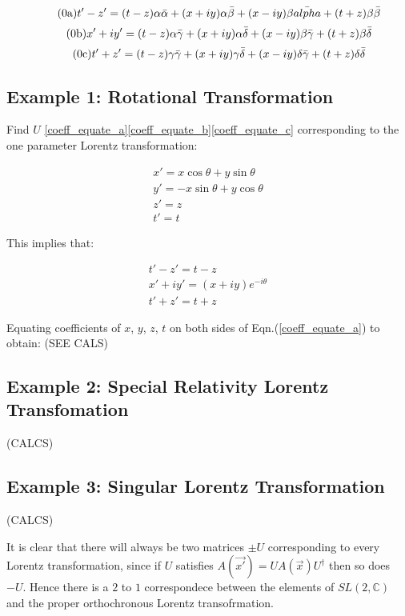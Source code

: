 \begin{equation}\label{coeff_equate_a}
\tag{{\theequation}a}
t' - z' = (t-z)\alpha\bar{\alpha} + (x + iy)\alpha\bar{\beta} + (x - iy)\beta\bar{alpha} + (t+z)\beta\bar{\beta}
\end{equation}
\begin{equation}\label{coeff_equate_b}
\tag{{\theequation}b}
x' + iy' = (t-z)\alpha\bar{\gamma} + (x + iy)\alpha\bar{\delta} + (x-iy)\beta\bar{\gamma} + (t+z)\beta\bar{\delta}
\end{equation}
\begin{equation}\label{coeff_equate_c}
\tag{{\theequation}c}
t' + z' = (t-z)\gamma\bar{\gamma} + (x + iy)\gamma\bar{\delta} + (x-iy)\delta\bar{\gamma} + (t+z)\delta\bar{\delta}
\end{equation}

\subsection{Example 1: Rotational Transformation}

\noindent Find $U$ \ref{coeff_equate_a}\ref{coeff_equate_b}\ref{coeff_equate_c} corresponding to the one parameter Lorentz transformation:

\begin{eqnarray*} 
x' = x\cos{\theta} + y\sin{\theta} \\
y' = -x\sin{\theta} + y\cos{\theta} \\
z' = z \\
t' = t
\end{eqnarray*} 

\noindent This implies that:

\begin{eqnarray*}
t'-z' = t-z \\
x'+iy' = (x+iy) e^{-i \theta} \\
t'+z' = t+z
\end{eqnarray*}

Equating coefficients of $x$, $y$, $z$, $t$ on both sides of Eqn.(\ref{coeff_equate_a}) to obtain: (SEE CALS)

\subsection{Example 2: Special Relativity Lorentz Transfomation}\label{Special_Linear_Matrices_Example_2}

(CALCS)

\subsection{Example 3: Singular Lorentz Transformation}\label{Special_Linear_Matrices_Example_3}

(CALCS)

It is clear that there will always be two matrices $\pm U$ corresponding to every Lorentz transformation, since if $U$ satisfies $A(\vec{x'}) = U A(\vec{x}) U^{\dagger}$ then so does $-U$. Hence there is a $2$ to $1$ correspondece between the elements of $SL(2,\mathbb{C})$ and the proper orthochronous Lorentz transofrmation.
